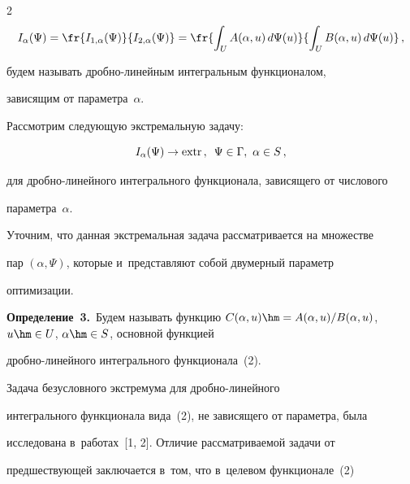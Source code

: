 \begin{multicols}{2}
\begin{equation}
I_\alpha(\Psi) = \fr{I_{1,\alpha}(\Psi)}{ 

I_{2,\alpha}(\Psi)}=\fr{\int\nolimits_U A(\alpha,u)\,d\Psi(u)} 

{\int\nolimits_U B(\alpha,u)\,d\Psi(u)}\,,

\label{e2-shn}

\end{equation}

будем называть дроб\-но-ли\-ней\-ным интегральным функционалом, 

зависящим от па\-ра\-мет\-ра~$\alpha$.

     

     Рассмотрим следующую экстремальную задачу:

     \begin{equation}

     I_\alpha(\Psi)\to \mathrm{extr}\,,\enskip \Psi\in \Gamma,\ \alpha\in S\,,

     \label{e3-shn}

     \end{equation}

для дробно-ли\-ней\-но\-го интегрального функционала, зависящего от чис\-ло\-во\-го 

па\-ра\-мет\-ра~$\alpha$.

     

     Уточним, что данная экстремальная задача рассматривается на множестве 

пар $(\alpha, \Psi)$, которые и~пред\-став\-ля\-ют собой двумерный параметр 

оптимизации.

     

     \smallskip

     

     \noindent

     \textbf{Определение~3.}\ Будем называть функцию $C(\alpha,u)\hm= 

A(\alpha,u)/B(\alpha,u)$, $u\hm\in U$, $\alpha\hm\in S$, основной функцией  

дроб\-но-ли\-ней\-но\-го интегрального функционала~(2).

     

     Задача безусловного экстремума для дроб\-но-ли\-ней\-но\-го 

интегрального функционала вида~(2), не зависящего от па\-ра\-мет\-ра, была 

исследована в~работах~[1, 2]. Отличие рассматриваемой задачи от 

предшествующей заключается в~том, что в~целевом функционале~(2) 


\end{multicols}
